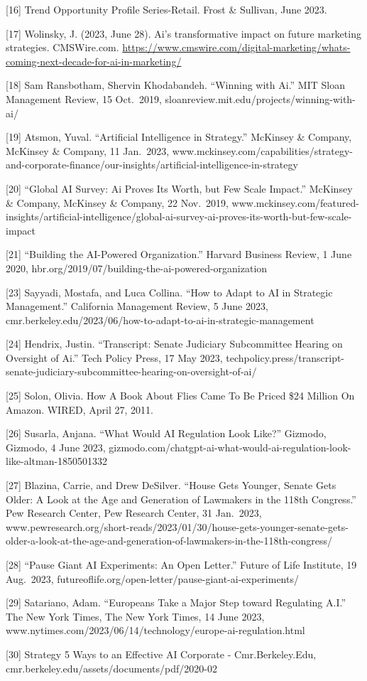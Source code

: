 \documentclass[
]{book}
\begin{document}
{[}16{]} Trend Opportunity Profile Series-Retail. Frost \& Sullivan, June 2023.

{[}17{]} Wolinsky, J. (2023, June 28). Ai's transformative impact on future marketing strategies. CMSWire.com. \url{https://www.cmswire.com/digital-marketing/whats-coming-next-decade-for-ai-in-marketing/}

{[}18{]} Sam Ransbotham, Shervin Khodabandeh. ``Winning with Ai.'' MIT Sloan Management Review, 15 Oct.~2019, sloanreview.mit.edu/projects/winning-with-ai/

{[}19{]} Atsmon, Yuval. ``Artificial Intelligence in Strategy.'' McKinsey \& Company, McKinsey \& Company, 11 Jan.~2023, www.mckinsey.com/capabilities/strategy-and-corporate-finance/our-insights/artificial-intelligence-in-strategy

{[}20{]} ``Global AI Survey: Ai Proves Its Worth, but Few Scale Impact.'' McKinsey \& Company, McKinsey \& Company, 22 Nov.~2019, www.mckinsey.com/featured-insights/artificial-intelligence/global-ai-survey-ai-proves-its-worth-but-few-scale-impact

{[}21{]} ``Building the AI-Powered Organization.'' Harvard Business Review, 1 June 2020, hbr.org/2019/07/building-the-ai-powered-organization

{[}23{]} Sayyadi, Mostafa, and Luca Collina. ``How to Adapt to AI in Strategic Management.'' California Management Review, 5 June 2023, cmr.berkeley.edu/2023/06/how-to-adapt-to-ai-in-strategic-management

{[}24{]} Hendrix, Justin. ``Transcript: Senate Judiciary Subcommittee Hearing on Oversight of Ai.'' Tech Policy Press, 17 May 2023, techpolicy.press/transcript-senate-judiciary-subcommittee-hearing-on-oversight-of-ai/

{[}25{]} Solon, Olivia. How A Book About Flies Came To Be Priced \$24 Million On Amazon. WIRED, April 27, 2011.

{[}26{]} Susarla, Anjana. ``What Would AI Regulation Look Like?'' Gizmodo, Gizmodo, 4 June 2023, gizmodo.com/chatgpt-ai-what-would-ai-regulation-look-like-altman-1850501332

{[}27{]} Blazina, Carrie, and Drew DeSilver. ``House Gets Younger, Senate Gets Older: A Look at the Age and Generation of Lawmakers in the 118th Congress.'' Pew Research Center, Pew Research Center, 31 Jan.~2023, www.pewresearch.org/short-reads/2023/01/30/house-gets-younger-senate-gets-older-a-look-at-the-age-and-generation-of-lawmakers-in-the-118th-congress/

{[}28{]} ``Pause Giant AI Experiments: An Open Letter.'' Future of Life Institute, 19 Aug.~2023, futureoflife.org/open-letter/pause-giant-ai-experiments/

{[}29{]} Satariano, Adam. ``Europeans Take a Major Step toward Regulating A.I.'' The New York Times, The New York Times, 14 June 2023, www.nytimes.com/2023/06/14/technology/europe-ai-regulation.html

{[}30{]} Strategy 5 Ways to an Effective AI Corporate - Cmr.Berkeley.Edu, cmr.berkeley.edu/assets/documents/pdf/2020-02

  
\end{document}
